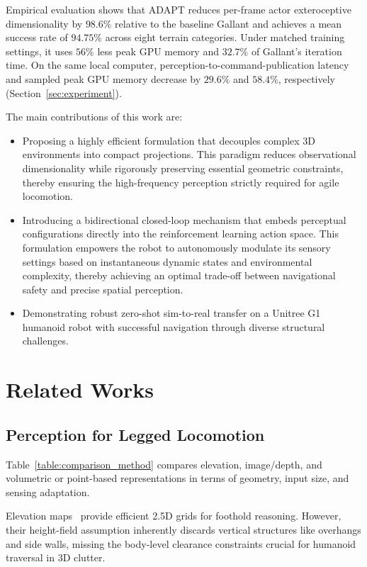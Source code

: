 \documentclass[letterpaper, 10 pt, conference]{ieeeconf/ieeeconf}
\DeclareRobustCommand{\RevisionAdd}[1]{{\color{red}#1}}
\begin{document}
\RevisionAdd{Empirical evaluation shows that ADAPT reduces per-frame actor exteroceptive dimensionality by $98.6\%$ relative to the baseline Gallant and achieves a mean success rate of $94.75\%$ across eight terrain categories. Under matched training settings, it uses $56\%$ less peak GPU memory and $32.7\%$ of Gallant's iteration time. On the same local computer, perception-to-command-publication latency and sampled peak GPU memory decrease by $29.6\%$ and $58.4\%$, respectively (Section~\ref{sec:experiment})}.

The main contributions of this work are:
\begin{itemize}
    \item Proposing a highly efficient formulation that decouples complex 3D environments into compact projections. This paradigm reduces observational dimensionality while rigorously preserving essential geometric constraints, thereby ensuring the high-frequency perception strictly required for agile locomotion.
    \item Introducing a bidirectional closed-loop mechanism that embeds perceptual configurations directly into the reinforcement learning action space. This formulation empowers the robot to autonomously modulate its sensory settings based on instantaneous dynamic states and environmental complexity, thereby achieving an optimal trade-off between navigational safety and precise spatial perception.
    \item Demonstrating robust zero-shot sim-to-real transfer on a Unitree G1 humanoid robot with successful navigation through diverse structural challenges.
\end{itemize}

\section{Related Works}
\subsection{Perception for Legged Locomotion}
\label{sec:RELATED WORKS}
\RevisionAdd{Table~\ref{table:comparison_method} compares elevation, image/depth, and volumetric or point-based representations in terms of geometry, input size, and sensing adaptation.}

Elevation maps~\cite{Fankhauser2014RobotCentricElevationMapping,Fankhauser2018ProbabilisticTerrainMapping,long2025learning,wang2025beamdojo,ren2025vb,he2025attention,Zhang_2026_AME2} provide efficient 2.5D grids for foothold reasoning. However, their height-field assumption inherently discards vertical structures like overhangs and side walls, missing the body-level clearance constraints crucial for humanoid traversal in 3D clutter.
\end{document}

